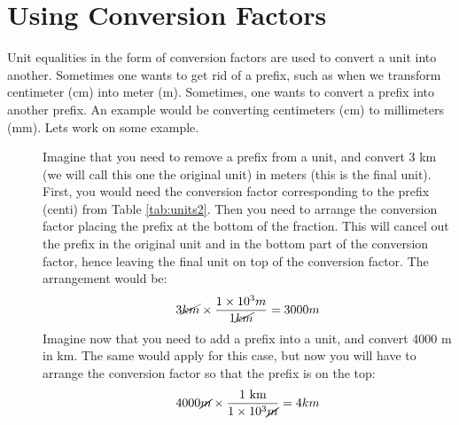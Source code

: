 \documentclass[main.tex]{subfiles}
\begin{document}
\section{Using Conversion Factors}


Unit equalities in the form of conversion factors are used to convert a unit into another. Sometimes one wants to get rid of a prefix, such as when we transform centimeter (cm) into meter (m). Sometimes, one wants to convert a prefix into another prefix. An example would be converting centimeters (cm) to millimeters (mm). Let\textquotesingle s work on some example.

\begin{description}
\item[] Imagine that you need to remove a prefix from a unit, and convert 3 km (we will call this one the original unit) in meters (this is the final unit). First, you would need the conversion factor corresponding to the prefix (centi) from Table \ref{tab:units2}. Then you need to arrange the conversion factor placing the prefix at the bottom of the fraction. This will cancel out the prefix in the original unit and in the bottom part of the conversion factor, hence leaving the final unit on top of the conversion factor. The arrangement would be:
\begin{equation*}
3\cancel{km} \times \dfrac{1\times10^{3}m}{1\cancel{km}}=3000m
\end{equation*}
Imagine now that you need to add a prefix into a unit, and convert 4000 m in km. The same would apply for this case, but now you will have to arrange the conversion factor so that the prefix is on the top:
\begin{equation*}
4000\cancel{m} \times \dfrac{\text{1 km}}{1\times10^{3}\cancel{m}}=4km
\end{equation*}


%



\end{description}
\end{document}
